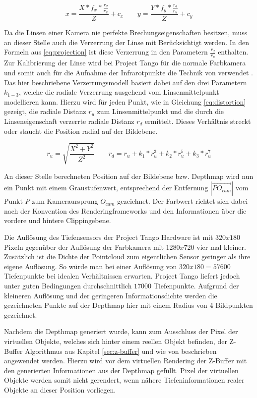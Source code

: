 \begin{equation}\label{eq:projection}
x = \frac{X* f_x * \frac{r_d}{r_u}}{Z}  + c_x
\qquad
y = \frac{Y* f_y * \frac{r_d}{r_u}}{Z}  + c_y
\end{equation}

Da die Linsen einer Kamera nie perfekte Brechungseigenschaften besitzen, muss an dieser Stelle auch die Verzerrung der Linse mit Berücksichtigt werden. In den Formeln aus \ref{eq:projection} ist diese Verzerrung in den Parametern \(\frac{r_d}{r_u}\) enthalten. Zur Kalibrierung der Linse wird bei Project Tango für die normale Farbkamera und somit auch für die Aufnahme der Infrarotpunkte die Technik von \citet{tsai1987versatile} verwendet  \citep{Tango90:online}. Das hier beschriebene Verzerrungsmodell basiert dabei auf den drei Parametern \(k_{1-3}\), welche die radiale Verzerrung ausgehend vom Linsenmittelpunkt modellieren kann. Hierzu wird für jeden Punkt, wie in Gleichung \ref{eq:distortion} gezeigt, die radiale Distanz \(r_u\) zum Linsenmittelpunkt und die durch die Linseneigenschaft verzerrte radiale Distanz \(r_d\) ermittelt. Dieses Verhältnis streckt oder staucht die Position radial auf der Bildebene.


\begin{equation} \label{eq:distortion}
r_u = \sqrt{\frac{X^2 + Y^2}{ Z^2}} 
\qquad
r_d = r_u + k_1 * r_u^3 + k_2 * r_u^5 + k_3 * r_u^7
\end{equation}

An dieser Stelle berechneten Position auf der Bildebene bzw. Depthmap wird nun ein Punkt mit einem Graustufenwert, entsprechend der Entfernung \(|\overrightarrow{PO_{cam}}|\) vom Punkt \(P\) zum Kameraursprung \(O_{cam}\) gezeichnet. Der Farbwert richtet sich dabei nach der Konvention des Renderingframeworks und den Informationen über die vordere und hintere Clippingebene.

Die Auflösung des Tiefensensors der Project Tango Hardware ist mit \(320x180\) Pixeln gegenüber der Auflösung der Farbkamera mit \(1280x720\) vier mal kleiner. Zusätzlich ist die Dichte der Pointcloud zum eigentlichen Sensor geringer als ihre eigene Auflösung. So würde man bei einer Auflösung von \(320x180 = 57600\) Tiefenpunkte bei idealen Verhältnissen erwarten. Project Tango liefert jedoch unter guten Bedingungen durchschnittlich \(17000\) Tiefenpunkte. Aufgrund der kleineren Auflösung und der geringeren Informationsdichte werden die gezeichneten Punkte auf der Depthmap hier mit einem Radius von 4 Bildpunkten gezeichnet. 

Nachdem die Depthmap generiert wurde, kann zum Ausschluss der Pixel der virtuellen Objekte, welches sich hinter einem reellen Objekt befinden, der Z-Buffer Algorithmus aus Kapitel \ref{sec:z-buffer} und wie von \citet{wloka1995resolving} beschrieben angewendet werden. Hierzu wird vor dem virtuellen Rendering der Z-Buffer mit den generierten Informationen aus der Depthmap gefüllt. Pixel der virtuellen Objekte werden somit nicht gerendert, wenn nähere Tiefeninformationen realer Objekte an dieser Position vorliegen. 


